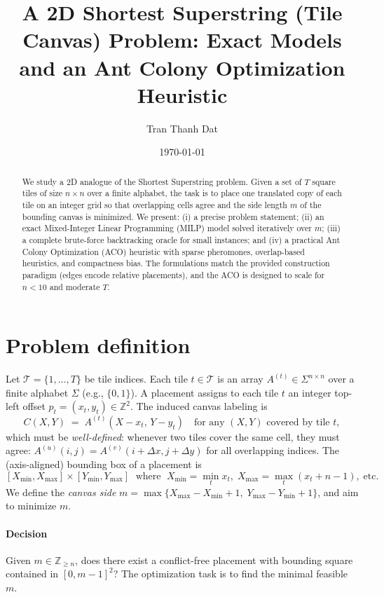 \documentclass[11pt]{article}
\title{A 2D Shortest Superstring (Tile Canvas) Problem: \newline Exact Models and an Ant Colony Optimization Heuristic}
\author{Tran Thanh Dat}
\date{\today}
\newcommand{\bbZ}{\mathbb{Z}}
\begin{document}
\maketitle

\begin{abstract}
We study a 2D analogue of the Shortest Superstring problem. Given a set of $T$ square tiles of size $n\times n$ over a finite alphabet, the task is to place one translated copy of each tile on an integer grid so that overlapping cells agree and the side length $m$ of the bounding canvas is minimized. We present: (i) a precise problem statement; (ii) an exact Mixed-Integer Linear Programming (MILP) model solved iteratively over $m$; (iii) a complete brute-force backtracking oracle for small instances; and (iv) a practical Ant Colony Optimization (ACO) heuristic with sparse pheromones, overlap-based heuristics, and compactness bias. The formulations match the provided construction paradigm (edges encode relative placements), and the ACO is designed to scale for $n<10$ and moderate $T$.
\end{abstract}

\section{Problem definition}
Let $\mathcal{T}=\{1,\dots,T\}$ be tile indices. Each tile $t\in\mathcal{T}$ is an array $A^{(t)}\in\Sigma^{n\times n}$ over a finite alphabet $\Sigma$ (e.g., $\{0,1\}$). A placement assigns to each tile $t$ an integer top-left offset $p_t=(x_t,y_t)\in\bbZ^2$. The induced canvas labeling is
\[
C(X,Y) \;=\; A^{(t)}(X-x_t,\,Y-y_t) \quad \text{for any $(X,Y)$ covered by tile $t$},
\]
which must be \emph{well-defined}: whenever two tiles cover the same cell, they must agree: $A^{(u)}(i,j)=A^{(v)}(i+\Delta x, j+\Delta y)$ for all overlapping indices. The (axis-aligned) bounding box of a placement is
\[
[X_{\min},X_{\max}]\times[Y_{\min},Y_{\max}] \;\text{ where }\; X_{\min}=\min_t x_t,\; X_{\max}=\max_t(x_t+n-1),\; \text{etc.}
\]
We define the \emph{canvas side} $m=\max\{X_{\max}-X_{\min}+1,\;Y_{\max}-Y_{\min}+1\}$, and aim to minimize $m$.

\paragraph{Decision} Given $m\in\bbZ_{\ge n}$, does there exist a conflict-free placement with bounding square contained in $[0,m-1]^2$? The optimization task is to find the minimal feasible $m$.
\end{document}
